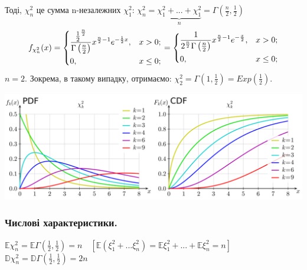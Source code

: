 Тоді, $\chi^2_n$ це сумма n-незалежних $\chi_1^2$: $\chi^2_n = \underbrace{\chi_1^2 + ... + \chi_1^2}_{n} = \Gamma \left(  \frac{n}{2}, \frac{1}{2} \right)  $
$$
f_{
\chi_n^2
} (x) = \begin{dcases}
 \frac{ \frac{1}{2}^{ \frac{n}{2}  }  }{ \Gamma \left(  \frac{n}{2}  \right) } x^{ \frac{n}{2} -1  } e^{- \frac{1}{2}x }, & x > 0;\\
 0 , & x \leq 0;
\end{dcases}  =
\begin{dcases}
\frac{ 1 }{2^{ \frac{n}{2}  }  \Gamma \left(  \frac{n}{2}  \right) } x^{ \frac{n}{2} -1  } e^{- \frac{x}{2} }, & x > 0;\\
0 , & x \leq 0;
\end{dcases}
$$
$n = 2.$ Зокрема, в такому випадку, отримаємо: $ \chi_2^2 = \Gamma \left( 1, \frac{1}{2}  \right) = Exp \left( \frac{1}{2} \right)  $.
\begin{center}
\includegraphics[scale=0.3]{assets/lectures_part_3-d1334d87.png} 
\end{center}
\subsubsection{Числові характеристики.}
$\mathbb{E} \chi^2_n = \mathbb{E} \Gamma \left( \frac{1}{2} , \frac{1}{2}   \right) = n  \quad \left[ \mathbb{E} \left( \xi_1^2 + ... \xi_n^2 \right) = \mathbb{E} \xi_1^2 + ... + \mathbb{E}\xi_n^2 = n \right]$\\
$\mathbb{D} \chi^2_n = \mathbb{D} \Gamma \left( \frac{1}{2} , \frac{1}{2}   \right) = 2n $
